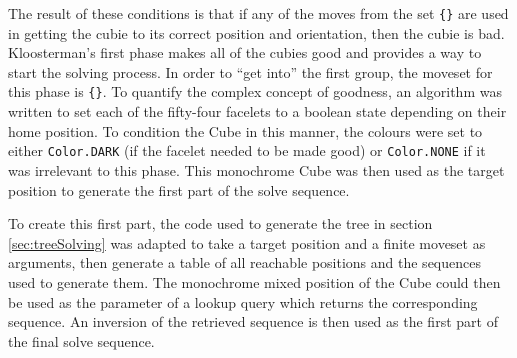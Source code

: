 \documentclass{report}
\newcommand{\moveset}[1]{\uppercase{\texttt{\{\formatmoves{#1}\}}}}
\begin{document}
	The result of these conditions is that if any of the moves from the set \moveset{u.u'd.d'} are used in getting the cubie to its correct position and orientation, then the cubie is bad. Kloosterman's first phase makes all of the cubies good and provides a way to start the solving process. In order to \enquote{get into} the first group, the moveset for this phase is \moveset{u'd'l'r'f'b'}. To quantify the complex concept of goodness, an algorithm was written to set each of the fifty-four facelets to a boolean state depending on their home position. To condition the Cube in this manner, the colours were set to either \lstinline|Color.DARK| (if the facelet needed to be made good) or \lstinline|Color.NONE| if it was irrelevant to this phase. This monochrome Cube was then used as the target position to generate the first part of the solve sequence.
	
	To create this first part, the code used to generate the tree in section \ref{sec:treeSolving} was adapted to take a target position and a finite moveset as arguments, then generate a table of all reachable positions and the sequences used to generate them. The monochrome mixed position of the Cube could then be used as the parameter of a lookup query which returns the corresponding sequence. An inversion of the retrieved sequence is then used as the first part of the final solve sequence.
	
\end{document}
